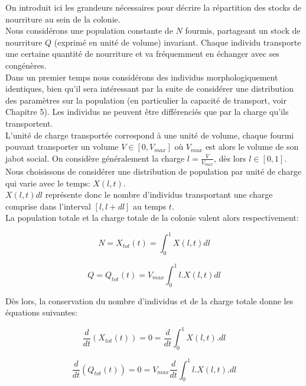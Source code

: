 On introduit ici les grandeurs nécessaires pour décrire la répartition des stocks de nourriture au sein de la colonie.\\

Nous considérons une population constante de $N$ fourmis, partageant un stock de nourriture $Q$ (exprimé en unité de volume) invariant. Chaque individu transporte une certaine quantité de nourriture  et va fréquemment en échanger avec ses congénères. \\

Dans un premier temps nous considérons des individus morphologiquement identiques, bien qu'il sera intéressant par la suite de considérer une distribution des paramètres sur la population (en particulier la capacité de transport, voir Chapitre 5). Les individus ne peuvent être différenciés que par la charge qu'ils transportent.\\

L'unité de charge transportée correspond à une unité de volume, chaque fourmi pouvant transporter un volume $V\in[0,V_{max}]$ où $V_{max}$ est alors le volume de son jabot social. On considère généralement la charge $l=\frac{V}{V_{max}}$, dès lors $l\in[0,1]$.\\

Nous choisissons de considérer une distribution de population par unité de charge qui varie avec le temps: $X(l,t)$.\\
$X(l,t)dl$ représente donc le nombre d'individus transportant une charge comprise dans l'interval $[l,l+dl]$ au temps $t$.\\

La population totale et la charge totale de la colonie valent alors respectivement:

\begin{equation}
N = X_{tot}(t) = \int^1_0X(l,t) dl
\label{Xtot}
\end{equation}

\begin{equation}
Q = Q_{tot}(t) = V_{max} \int^1_0 l.X(l,t) dl
\label{Qtot}
\end{equation}


Dès lors, la conservation du nombre d'individus et de la charge totale donne les équations suivantes:

\begin{equation}
\frac{d}{d t} (X_{tot}(t)) = 0 = \frac{d}{dt}\int^1_0 X(l,t).dl
\label{ConservationXtot}
\end{equation}

\begin{equation}
\frac{d}{d t} (Q_{tot}(t)) = 0 = V_{max} \frac{d}{dt}\int^1_0 l.X(l,t).dl
\label{ConservationQtot}
\end{equation}

